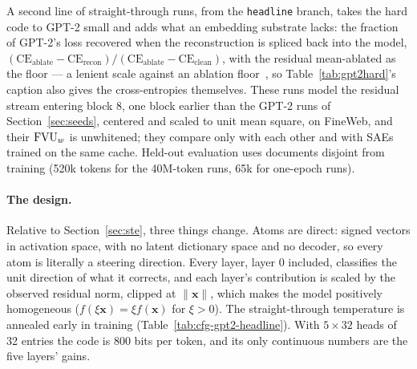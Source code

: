 A second line of straight-through runs, from the \texttt{headline}
branch, takes the hard code to GPT-2 small and adds what an embedding
substrate lacks: the fraction of GPT-2's loss recovered when the
reconstruction is spliced back into the model,
$(\mathrm{CE}_{\mathrm{ablate}} - \mathrm{CE}_{\mathrm{recon}})
/(\mathrm{CE}_{\mathrm{ablate}} - \mathrm{CE}_{\mathrm{clean}})$, with the
residual mean-ablated as the floor --- a lenient scale against an
ablation floor~\cite{gao2024}, so Table~\ref{tab:gpt2hard}'s caption also
gives the cross-entropies themselves. These runs model the residual stream
entering block 8, one block earlier than the GPT-2 runs of
Section~\ref{sec:seeds}, centered and scaled to unit mean square, on
FineWeb, and their $\mathrm{FVU}_w$ is unwhitened; they compare only with each other
and with SAEs trained on the same cache. Held-out evaluation uses
documents disjoint from training (520k tokens for the 40M-token runs, 65k
for one-epoch runs).

\paragraph{The design.} Relative to Section~\ref{sec:ste}, three things
change. Atoms are direct: signed vectors in activation space, with no
latent dictionary space and no decoder, so every atom is literally a
steering direction. Every layer, layer 0 included, classifies the unit
direction of what it corrects, and each layer's contribution is scaled by
the observed residual norm, clipped at $\lVert\mathbf{x}\rVert$, which
makes the model positively homogeneous ($f(\xi\mathbf{x}) = \xi
f(\mathbf{x})$ for $\xi > 0$). The straight-through temperature is
annealed early in training (Table~\ref{tab:cfg-gpt2-headline}). With
$5\times32$ heads of 32 entries the code is 800 bits per token, and its
only continuous numbers are the five layers' gains.

